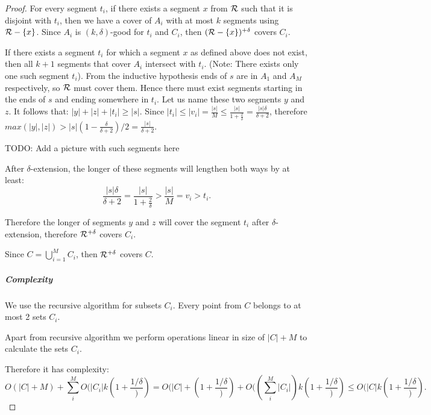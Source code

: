 \begin{proof}
For every segment $t_i$, if there exists a segment $x$ from $\mathcal{R}$ 
such that it is disjoint with $t_i$,
then we have a cover of $A_i$ with at most $k$
segments using $\mathcal{R} - \{x\}$.
Since $A_i$ is $(k, \delta)$-good for $t_i$ and $C_i$,
then $(\mathcal{R} - \{x\})^{+\delta}$ covers $C_i$.

If there exists a segment $t_i$ for which a segment $x$ as defined above
does not exist, then all $k+1$ segments that cover
$A_i$ intersect with $t_i$. (Note: There exists only one such segment $t_i$).
From the inductive hypothesis ends of $s$ are
in $A_1$ and $A_M$ respectively, so $\mathcal{R}$ must cover them.
Hence there must exist
segments starting in the ends of $s$ and ending somewhere in $t_i$.
Let us name these two segments $y$ and $z$. It follows that:
$|y| + |z| + |t_i| \ge |s|$.
Since $|t_i| \le |v_i| = \frac{|s|}{M} \le \frac{|s|}{1+\frac{2}{\delta}} = \frac{|s|\delta}{\delta+2}$,
therefore $max(|y|, |z|) > |s|(1-\frac{\delta}{\delta+2})/2 = \frac{|s|}{\delta+2}$.

TODO: Add a picture with such segments here

After $\delta$-extension, the longer of these segments will
lengthen both ways by at least:
$$\frac{|s|\delta}{\delta+2} = \frac{|s|}{1+\frac{2}{\delta}} > \frac{|s|}{M} = v_i > t_i.$$

Therefore the longer of segments $y$ and $z$ will cover the segment $t_i$
after $\delta$-extension, therefore $\mathcal{R}^{+\delta}$ covers $C_i$.

Since $C = \bigcup_{i=1}^M C_i$,
then $\mathcal{R}^{+\delta}$ covers $C$.

\subparagraph{Complexity}

We use the recursive algorithm for subsets $C_i$. Every point
from $C$ belongs to at most 2 sets $C_i$.

Apart from recursive algorithm we perform operations linear in
size of $|C| + M$ to calculate the sets $C_i$.

Therefore it has complexity:
$$O(|C|+M) + \sum_i^M O(|C_i|k(1+\frac{1/\delta})) = 
O(|C| + (1+\frac{1/\delta})) + O((\sum_i^M |C_i|)k(1+\frac{1/\delta})) \le O(|C|k(1+\frac{1/\delta})).$$

\end{proof}

